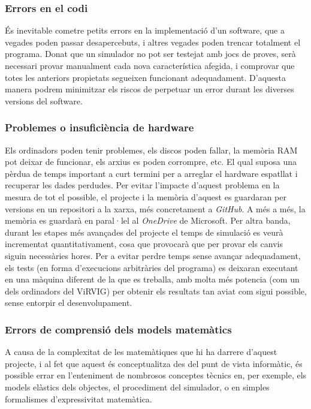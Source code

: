 \documentclass[a4paper]{report}
\begin{document}
	\subsubsection{Errors en el codi}
	És inevitable cometre petits errors en la implementació d'un software, que a vegades poden passar desapercebuts, i altres vegades poden trencar totalment el programa.\newline
	Donat que un simulador no pot ser testejat amb jocs de proves, serà necessari provar manualment cada nova característica afegida, i comprovar que totes les anteriors propietats segueixen funcionant adequadament. D'aquesta manera podrem minimitzar els riscos de perpetuar un error durant les diverses versions del software.
	\subsubsection{Problemes o insuficiència de hardware}
	Els ordinadors poden tenir problemes, els discos poden fallar, la memòria RAM pot deixar de funcionar, els arxius es poden corrompre, etc. El qual suposa una pèrdua de temps important a curt termini per a arreglar el hardware espatllat i recuperar les dades perdudes. \newline
	Per evitar l'impacte d'aquest problema en la mesura de tot el possible, el projecte i la memòria d'aquest es guardaran per versions en un repositori a la xarxa, més concretament a \textit{GitHub}. A més a més, la memòria es guardarà en paral·lel al \textit{OneDrive} de Microsoft.
	\newline
	Per altra banda, durant les etapes més avançades del projecte el temps de simulació es veurà incrementat quantitativament, cosa que provocarà que per provar els canvis siguin necessàries hores. \newline
	Per a evitar perdre temps sense avançar adequadament, els tests (en forma d'execucions arbitràries del programa) es deixaran executant en una màquina diferent de la que es treballa, amb molta més potencia (com un dels ordinadors del ViRVIG) per obtenir els resultats tan aviat com sigui possible, sense entorpir el desenvolupament.
	\subsubsection{Errors de comprensió dels models matemàtics}
	A causa de la complexitat de les matemàtiques que hi ha darrere d'aquest projecte, i al fet que aquest és conceptualitza des del punt de vista informàtic, és possible errar en l'enteniment de nombrosos conceptes tècnics en, per exemple, els models elàstics dels objectes, el procediment del simulador, o en simples formalismes d'expressivitat matemàtica. \newline
\end{document}
